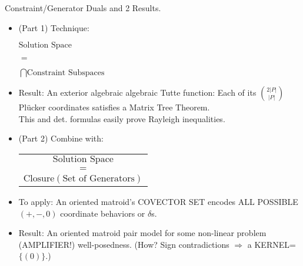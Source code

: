 \documentclass{beamer}
\newcommand{\Remph}[1]{{\color{red}#1}}
\begin{document}
\begin{frame}{Constraint/Generator Duals and 2 Results.}
\begin{minipage}{0.48\textwidth}

\begin{itemize}
\item
(Part 1) Technique:
\begin{center}$\text{Solution Space}$\end{center}
\begin{center}$=$\end{center}
\begin{center}$\bigcap \text{Constraint Subspaces}$\end{center}
\item
\Remph{Result:} An exterior algebraic
algebraic Tutte function: Each of its
$\binom{2|P|}{|P|}$
Pl\"{u}cker coordinates
satisfies a Matrix
Tree Theorem.\\
 
This and det. formulas
easily prove Rayleigh inequalities.
\end{itemize}

\end{minipage}
\begin{minipage}{0.48\textwidth}

\begin{itemize}
\item
(Part 2) Combine with:
\begin{tabular}{c}
$\text{Solution Space}$\\
$=$\\
$\text{Closure}(\text{Set of Generators})$\\
\end{tabular}
\item
To apply: An oriented matroid's
COVECTOR SET encodes ALL POSSIBLE
 $(+,-,0)$ coordinate behaviors or
$\delta$s.
\item
\Remph{Result:} 
An oriented matroid pair model
for some non-linear problem
\Remph{(AMPLIFIER!)} well-posedness. 
(How? Sign contradictions $\Rightarrow$
a KERNEL=$\{(0)\}$.)
\end{itemize}
\end{minipage}
\end{frame}
\end{document}
